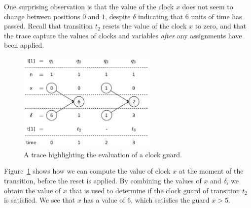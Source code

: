 \documentclass[a4paper,11pt]{report}
\theoremstyle{definition}
\begin{document}
One surprising observation is that the value of the clock $x$ does not seem to
change between positions $0$ and $1$, despite $\delta$ indicating that $6$ units
of time has passed. Recall that transition $t_{2}$ resets the value of the clock
$x$ to zero, and that the trace capture the values of clocks and variables
\emph{after} any assignments have been applied.

\begin{figure}[h]
  \centering
  \includegraphics[width=0.6\textwidth]{trace-shift-delta}
  \caption{A trace highlighting the evaluation of a clock guard.}
  \label{fig:trace-delta}
\end{figure}

Figure~\ref{fig:trace-delta} shows how we can compute the value of clock $x$ at
the moment of the transition, before the reset is applied. By combining the
values of $x$ and $\delta$, we obtain the value of $x$ that is used to determine
if the clock guard of transition $t_{2}$ is satisfied. We see that $x$ has a
value of 6, which satisfies the guard $x>5$.
\end{document}
